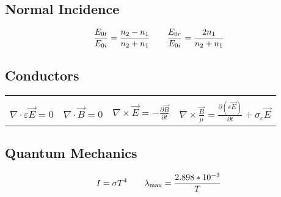 \documentclass{article}
\begin{document}
\subsection*{Normal Incidence}
\[\frac{E_{0t}}{E_{0i}}=\frac{n_2-n_1}{n_2+n_1}\hspace{7 mm}\frac{E_{0r}}{E_{0i}}=\frac{2n_1}{n_2+n_1}\]
\subsection*{Conductors}
\begin{center}
\begin{tabular}{|| c c c c ||}
\hline
&&&\\
\(\nabla\cdot\varepsilon\overrightarrow{E}=0\) & \(\nabla\cdot\overrightarrow{B}=0\) & \(\nabla\times\overrightarrow{E}=-\frac{\partial\overrightarrow{B}}{\partial t}\) & \(\nabla\times\frac{\overrightarrow{B}}{\mu}=\frac{\partial(\varepsilon\overrightarrow{E})}{\partial t}+\sigma_c\overrightarrow{E}\)\\[10pt]
\hline
\end{tabular}
\end{center}
\subsection*{Quantum Mechanics}
\[I=\sigma T^4\hspace{7 mm}\lambda_{\textnormal{max}}=\frac{2.898*10^{-3}}{T}\]
\end{document}
